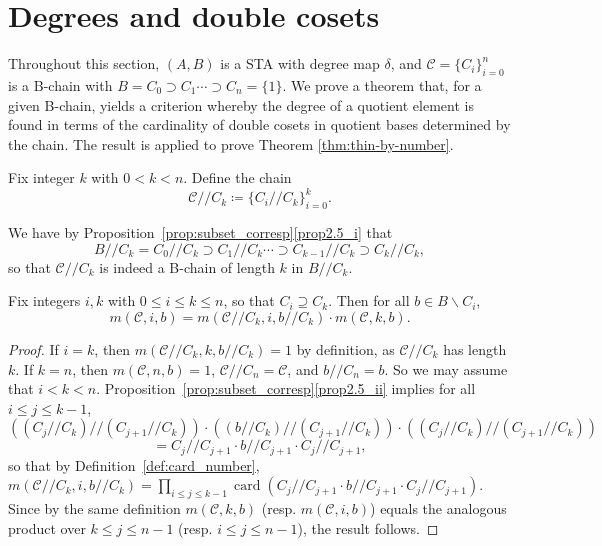 \documentclass[ALCO,ThmDefs,Unicode,epreuves]{cedram}
\DeclareMathOperator{\card}{card}
\begin{document}
 
\section{Degrees and double cosets}\label{sect3} 

Throughout this section, $(A, B)$ is a STA with degree map $\delta$, and
$\mathcal{C} = \{C_i\}_{i=0}^n$ is a B-chain with $B = C_0 \supset C_1
\cdots \supset C_n = \{1\}$. We prove a theorem that, for a given
B-chain, yields a criterion whereby the degree of a quotient element is
found in terms of the cardinality of double cosets in quotient bases
determined by the chain. The result is applied to prove Theorem
\ref{thm:thin-by-number}.

\begin{defi}
\label{def:quochain}
Fix integer $k$ with $0 < k < n$. Define the chain
\[
\mathcal{C}//C_k \coloneqq \{C_i//C_k\}_{i=0}^k.
\]
\end{defi}

\begin{rema}
\label{rem:quochain}
We have by Proposition~\ref{prop:subset_corresp}\ref{prop2.5_i} that
\[
B//C_k = C_0//C_k \supset C_1//C_k \cdots \supset C_{k-1}//C_k \supset
C_k//C_k,
\]
so that $\mathcal{C}//C_k$ is indeed a B-chain of length $k$ in
$B//C_k$.
\end{rema}

\begin{lemm}
\label{lem:chain_num_mult}
Fix integers $i, k$ with $0 \leq i \leq k \leq n$, so that $C_i
\supseteq C_k$.
Then for all $b \in B\backslash C_i$,
\[
m(\mathcal{C}, i, b) = m(\mathcal{C}//C_k, i, b//C_k)\cdot
m(\mathcal{C}, k, b).
\]
\end{lemm}
 
\begin{proof}
If $i = k$, then $m(\mathcal{C}//C_k, k, b//C_k) = 1$ by definition, as
$\mathcal{C}//C_k$ has length $k$. If $k = n$, then $m(\mathcal{C}, n,
b) = 1$, $\mathcal{C}//C_n = \mathcal{C}$, and $b//C_n = b$. So we may
assume that $i < k < n$. 
Proposition~\ref{prop:subset_corresp}\ref{prop2.5_ii} implies for all $i \leq j
\leq k-1$, 
\[
\left((C_j//C_k)//(C_{j+1}//C_k)\right) \cdot
\left((b//C_k)//(C_{j+1}//C_k)\right) \cdot
\left((C_j//C_k)//(C_{j+1}//C_k)\right)
\] 
\[
 = C_j//C_{j+1}\cdot b//C_{j+1}\cdot
C_j//C_{j+1},
\]
so that by Definition~\ref{def:card_number}, $m(\mathcal{C}//C_k, i,
b//C_k) = \prod_{i \leq j \leq k-1}\card (C_j//C_{j+1}\cdot
b//C_{j+1}\cdot C_j//C_{j+1})$. Since by the same definition $m(\mathcal{C}, k, b)$ (resp.
$m(\mathcal{C}, i, b)$) equals the analogous product over $k \leq j \leq
n-1$ (resp. $i \leq j \leq n-1$), the result follows.
\end{proof}
\end{document}

